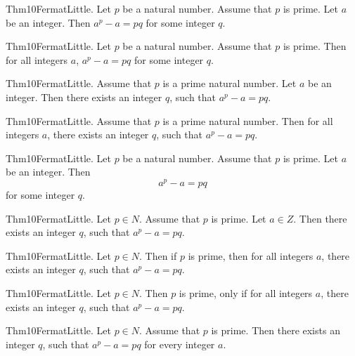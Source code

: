 \documentclass{article}
\begin{document}
Thm10FermatLittle. Let $p$ be a natural number. Assume that $p$ is prime. Let $a$ be an integer. Then $a ^ {p}- a = p q$ for some integer $q$.

Thm10FermatLittle. Let $p$ be a natural number. Assume that $p$ is prime. Then for all integers $a$, $a ^ {p}- a = p q$ for some integer $q$.

Thm10FermatLittle. Assume that $p$ is a prime natural number. Let $a$ be an integer. Then there exists an integer $q$, such that $a ^ {p}- a = p q$.

Thm10FermatLittle. Assume that $p$ is a prime natural number. Then for all integers $a$, there exists an integer $q$, such that $a ^ {p}- a = p q$.

Thm10FermatLittle. Let $p$ be a natural number. Assume that $p$ is prime. Let $a$ be an integer. Then $$a ^ {p}- a = p q$$ for some integer $q$.

Thm10FermatLittle. Let $p \in N$. Assume that $p$ is prime. Let $a \in Z$. Then there exists an integer $q$, such that $a ^ {p}- a = p q$.

Thm10FermatLittle. Let $p \in N$. Then if $p$ is prime, then for all integers $a$, there exists an integer $q$, such that $a ^ {p}- a = p q$.

Thm10FermatLittle. Let $p \in N$. Then $p$ is prime, only if for all integers $a$, there exists an integer $q$, such that $a ^ {p}- a = p q$.

Thm10FermatLittle. Let $p \in N$. Assume that $p$ is prime. Then there exists an integer $q$, such that $a ^ {p}- a = p q$ for every integer $a$.
\end{document}
